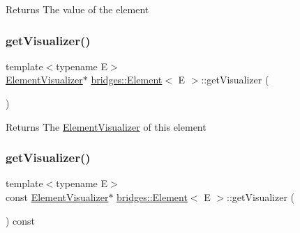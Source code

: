 \begin{DoxyReturn}{Returns}
The value of the element 
\end{DoxyReturn}
\hypertarget{classbridges_1_1_element_a358f350ae6e33d55c4ac9f9213d0c5bc}{}\label{classbridges_1_1_element_a358f350ae6e33d55c4ac9f9213d0c5bc} 
\subsubsection{\texorpdfstring{get\+Visualizer()}{getVisualizer()}\hspace{0.1cm}{\footnotesize\ttfamily [1/2]}}
{\footnotesize\ttfamily template$<$typename E$>$ \\
\hyperlink{classbridges_1_1_element_visualizer}{Element\+Visualizer}$\ast$ \hyperlink{classbridges_1_1_element}{bridges\+::\+Element}$<$ E $>$\+::get\+Visualizer (\begin{DoxyParamCaption}{ }\end{DoxyParamCaption})\hspace{0.3cm}{\ttfamily [inline]}}

\begin{DoxyReturn}{Returns}
The \hyperlink{classbridges_1_1_element_visualizer}{Element\+Visualizer} of this element 
\end{DoxyReturn}
\hypertarget{classbridges_1_1_element_a27d023054130e17234ace34ba35e766e}{}\label{classbridges_1_1_element_a27d023054130e17234ace34ba35e766e} 
\subsubsection{\texorpdfstring{get\+Visualizer()}{getVisualizer()}\hspace{0.1cm}{\footnotesize\ttfamily [2/2]}}
{\footnotesize\ttfamily template$<$typename E$>$ \\
const \hyperlink{classbridges_1_1_element_visualizer}{Element\+Visualizer}$\ast$ \hyperlink{classbridges_1_1_element}{bridges\+::\+Element}$<$ E $>$\+::get\+Visualizer (\begin{DoxyParamCaption}{ }\end{DoxyParamCaption}) const\hspace{0.3cm}{\ttfamily [inline]}}

